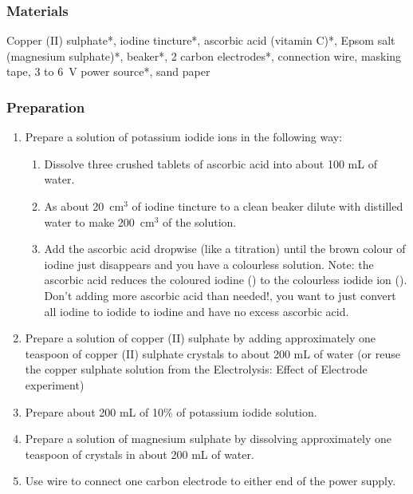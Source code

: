 \subsubsection*{Materials}
Copper (II) sulphate*, iodine tincture*, ascorbic acid (vitamin C)*, Epsom salt (magnesium sulphate)*, beaker*, 2 carbon electrodes*, connection wire, masking tape, 3 to 6~V power source*, sand paper

\subsubsection*{Preparation}
 \begin{enumerate}
\item{Prepare a solution of potassium iodide ions in the following way:
\begin{enumerate}
\item{Dissolve three crushed tablets of ascorbic acid into about 100 mL of water.}
\item{As about 20~cm$^{3}$ of iodine tincture to a clean beaker dilute with distilled water to make 200~cm$^{3}$ of the solution.}
\item{ Add the ascorbic acid dropwise (like a titration) until the brown colour of iodine just disappears and you have a colourless solution.} Note: the ascorbic acid reduces the coloured iodine () to the colourless iodide ion (). Don't adding more ascorbic acid than needed!, you want to just convert all iodine to iodide to iodine and have no excess ascorbic acid.
\end{enumerate}}

\item{Prepare a solution of copper (II) sulphate by adding approximately one teaspoon of copper (II) sulphate crystals to about 200 mL of water (or reuse the copper sulphate solution from the Electrolysis: Effect of Electrode experiment)}
\item{Prepare about 200 mL of 10\% of potassium iodide solution.}
\item{Prepare a solution of magnesium sulphate by dissolving approximately one teaspoon of crystals in about 200 mL of water.}
\item{Use wire to connect one carbon electrode to either end of the power supply.}

\end{enumerate}

